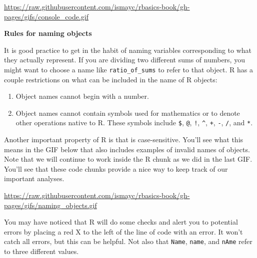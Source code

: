 \documentclass[]{tufte-book}
\providecommand{\tightlist}{%
  \setlength{\itemsep}{0pt}\setlength{\parskip}{0pt}}
\theoremstyle{definition}
\theoremstyle{definition}
\theoremstyle{remark}
\begin{document}
\vspace{0.1in}

\begin{center}\footnotesize{\url{https://raw.githubusercontent.com/ismayc/rbasics-book/gh-pages/gifs/console_code.gif}}\end{center}

\vspace{0.1in}

\vspace*{0.2in}

\noindent\textbf{Rules for naming objects}\vspace*{0.1in}

It is good practice to get in the habit of naming variables
corresponding to what they actually represent. If you are dividing two
different sums of numbers, you might want to choose a name like
\texttt{ratio\_of\_sums} to refer to that object. R has a couple
restrictions on what can be included in the name of R objects:

\begin{enumerate}
\def\labelenumi{\arabic{enumi}.}
\tightlist
\item
  Object names cannot begin with a number.
\item
  Object names cannot contain symbols used for mathematics or to denote
  other operations native to R. These symbols include \texttt{\$},
  \texttt{@}, \texttt{!}, \texttt{\^{}}, \texttt{+}, \texttt{-},
  \texttt{/}, and \texttt{*}.
\end{enumerate}

Another important property of R is that is case-sensitive. You'll see
what this means in the GIF below that also includes examples of invalid
names of objects. Note that we will continue to work inside the R chunk
as we did in the last GIF. You'll see that these code chunks provide a
nice way to keep track of our important analyses.

\vspace{0.1in}

\begin{center}\footnotesize{\url{https://raw.githubusercontent.com/ismayc/rbasics-book/gh-pages/gifs/naming_objects.gif}}\end{center}

\vspace{0.1in}

You may have noticed that R will do some checks and alert you to
potential errors by placing a red X to the left of the line of code with
an error. It won't catch all errors, but this can be helpful. Not also
that \texttt{Name}, \texttt{name}, and \texttt{nAme} refer to three
different values.
\end{document}
